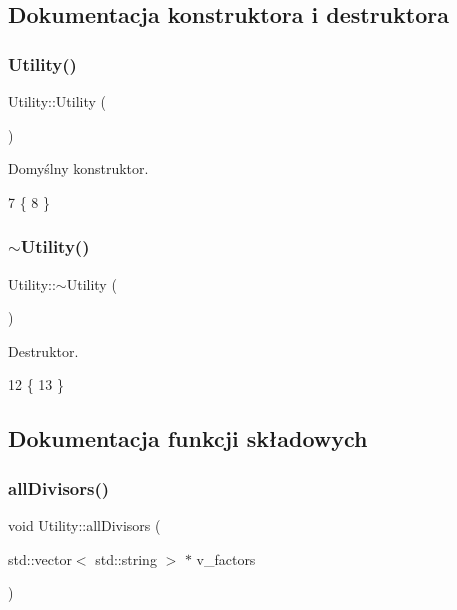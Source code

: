 \subsection{Dokumentacja konstruktora i destruktora}
\mbox{\label{class_utility_ac7af3e1642ac8d53ef180180a08fbd00}} 
\subsubsection{\texorpdfstring{Utility()}{Utility()}}
{\footnotesize\ttfamily Utility\+::\+Utility (\begin{DoxyParamCaption}{ }\end{DoxyParamCaption})}

Domyślny konstruktor. 
\begin{DoxyCode}
7 \{
8 \}
\end{DoxyCode}
\mbox{\label{class_utility_aecfe4b31e39b00555158a2d8288b874a}} 
\subsubsection{\texorpdfstring{$\sim$\+Utility()}{~Utility()}}
{\footnotesize\ttfamily Utility\+::$\sim$\+Utility (\begin{DoxyParamCaption}{ }\end{DoxyParamCaption})}

Destruktor. 
\begin{DoxyCode}
12 \{
13 \}
\end{DoxyCode}


\subsection{Dokumentacja funkcji składowych}
\mbox{\label{class_utility_a8aafe3b77344b4d230c431cbd64b09dc}} 
\subsubsection{\texorpdfstring{all\+Divisors()}{allDivisors()}}
{\footnotesize\ttfamily void Utility\+::all\+Divisors (\begin{DoxyParamCaption}\item[{std\+::vector$<$ std\+::string $>$ $\ast$}]{v\+\_\+factors }\end{DoxyParamCaption})}

